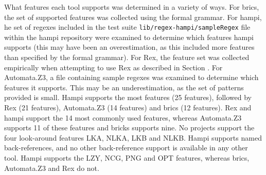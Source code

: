 What features each tool supports was determined in a variety of ways.  For brics, the set of supported features was collected using the formal grammar.  For hampi, he set of regexes included in the test suite {\tt lib/regex-hampi/sampleRegex} file within the hampi repository were examined to determine which features hampi supports (this may have been an overestimation, as this included more features than specified by the formal grammar).  For Rex, the feature set was collected empirically when attempting to use Rex as described in Section  .  For Automata.Z3, a file containing sample regexes was examined to determine which features it supports.  This may be an underestimation, as the set of patterns provided is small.  Hampi supports the most features (25 features), followed by Rex (21 features), Automata.Z3 (14 features) and brics (12 features).  Rex and hampi support the 14 most commonly used features, whereas Automata.Z3 supports 11 of these features and bricks supports nine.  No projects support the four look-around features LKA, NLKA, LKB and NLKB.  Hampi supports named back-references, and no other back-reference support is available in any other tool.  Hampi supports the LZY, NCG, PNG and OPT features, whereas brics, Automata.Z3 and Rex do not.





